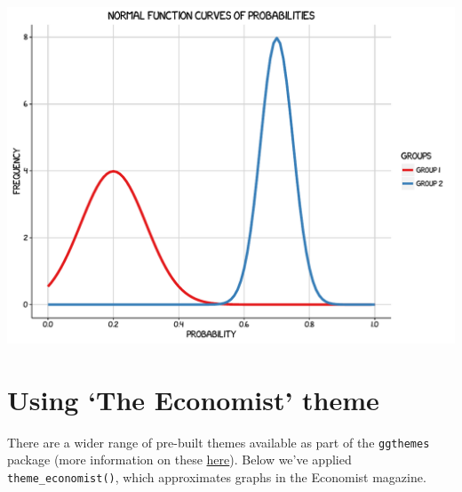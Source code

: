 \begin{Shaded}
\begin{Highlighting}[]
\StringTok{        } \NormalTok{(} \NormalTok{), }
\StringTok{        } \NormalTok{(), }
\StringTok{        } \NormalTok{(), } \NormalTok{(),}
\StringTok{        } \NormalTok{(} \NormalTok{),}
\StringTok{        }\NormalTok{(}\NormalTok{))}
\end{Highlighting}
\end{Shaded}

\begin{center}\includegraphics[width=0.55\linewidth]{figures/function_14-1} \end{center}

\section{\texorpdfstring{Using `The Economist'
theme}{Using The Economist theme}}\label{using-the-economist-theme-8}

There are a wider range of pre-built themes available as part of the
\texttt{ggthemes} package (more information on these
\href{https://cran.r-project.org/web/packages/ggthemes/vignettes/ggthemes.html}{here}).
Below we've applied \texttt{theme\_economist()}, which approximates
graphs in the Economist magazine.

